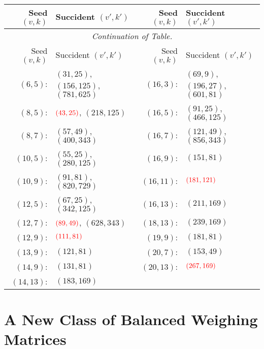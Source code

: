 \documentclass{beamer}
\newcommand{\RR}[1]{\textcolor{red}{#1}}
\begin{document}
\begin{frame}

  \begin{scriptsize}
    \begin{longtable}[c]{rl|rl}

      Seed $(v,k)$ & Succident $(v',k')$ & Seed $(v,k)$ & Succident $(v',k')$ \\
      \hline
      \endfirsthead

      \multicolumn{4}{c}{\it Continuation of Table.}\\
      Seed $(v,k)$ & Succident $(v',k')$ & Seed $(v,k)$ & Succident $(v',k')$ \\
      \hline
      \endhead

      \endfoot

      $(6,5)$: & $(31,25)$, $(156,125)$, $(781,625)$ & $(16,3)$: & $(69,9)$, $(196,27)$, $(601,81)$ \\
      $(8,5)$: & $\RR{(43,25)}$, $(218,125)$ & $(16,5)$: & $(91,25)$, $(466,125)$ \\
      $(8,7)$: & $(57,49)$, $(400,343)$ & $(16,7)$: & $(121,49)$, $(856,343)$ \\
      $(10,5)$: & $(55,25)$, $(280,125)$ & $(16,9)$: & $(151,81)$ \\
      $(10,9)$: & $(91,81)$, $(820,729)$ & $(16,11)$: & $\RR{(181,121)}$ \\
      $(12,5)$: & $(67,25)$, $(342,125)$ & $(16,13)$: & $(211,169)$ \\
      $(12,7)$: & $\RR{(89,49)}$, $(628,343)$ & $(18,13)$: & $(239,169)$ \\
      $(12,9)$: & $\RR{(111,81)}$ & $(19,9)$: & $(181,81)$ \\
      $(13,9)$: & $(121,81)$ & $(20,7)$: & $(153,49)$ \\
      $(14,9)$: & $(131,81)$ & $(20,13)$: & $\RR{(267,169)}$ \\
      $(14,13)$: & $(183,169)$ & & \\

    \end{longtable}
  \end{scriptsize}
  
\end{frame}


\section{A New Class of Balanced Weighing Matrices}
\end{document}
